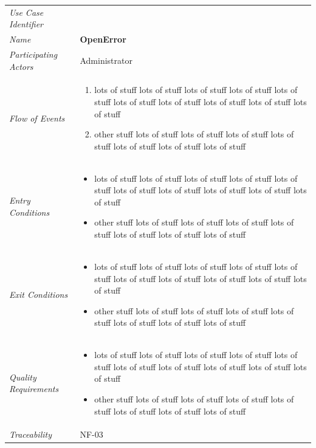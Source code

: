 \documentclass[12pt,letterpaper]{article}
\begin{document}
\begin{center}
	\begin{tabu} to 
		\toprule
		Use Case Identifier & \openerror{} \\
		Name & {\bf OpenError} \\
		Participating Actors & Administrator \\
		Flow of Events & 
	    \begin{enumerate}[topsep=-1em]
		    \item lots of stuff lots of stuff lots of stuff lots of stuff lots of stuff lots of stuff lots of stuff lots of stuff lots of stuff lots of stuff
		    \item other stuff lots of stuff lots of stuff lots of stuff lots of stuff lots of stuff lots of stuff lots of stuff
		\end{enumerate} \\

		Entry Conditions &
		\begin{itemize}[topsep=-1em]
		    \item lots of stuff lots of stuff lots of stuff lots of stuff lots of stuff lots of stuff lots of stuff lots of stuff lots of stuff lots of stuff
		    \item other stuff lots of stuff lots of stuff lots of stuff lots of stuff lots of stuff lots of stuff lots of stuff
        \end{itemize} \\

		Exit Conditions &
		\begin{itemize}[topsep=-1em]
		    \item lots of stuff lots of stuff lots of stuff lots of stuff lots of stuff lots of stuff lots of stuff lots of stuff lots of stuff lots of stuff
		    \item other stuff lots of stuff lots of stuff lots of stuff lots of stuff lots of stuff lots of stuff lots of stuff
        \end{itemize} \\

		Quality Requirements &
		\begin{itemize}[topsep=-1em]
		    \item lots of stuff lots of stuff lots of stuff lots of stuff lots of stuff lots of stuff lots of stuff lots of stuff lots of stuff lots of stuff
		    \item other stuff lots of stuff lots of stuff lots of stuff lots of stuff lots of stuff lots of stuff lots of stuff
        \end{itemize} \\

		Traceability & NF-03 \\
		\toprule
	\end{tabu}
\end{center}
\end{document}
